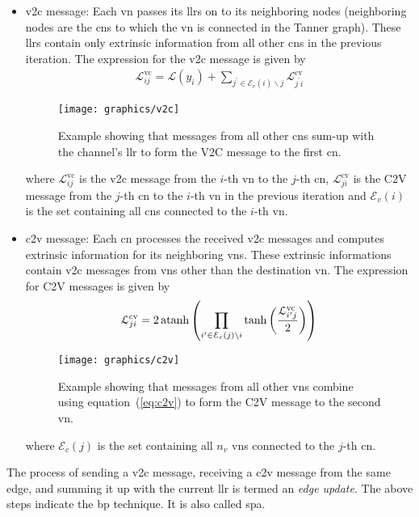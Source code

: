 \begin{itemize}
  \item \gls{v2c} message: Each \gls{vn} passes its \glspl{llr} on to its neighboring nodes (neighboring nodes are the \glspl{cn} to which the \gls{vn} is connected in the Tanner graph). These \glspl{llr} contain only extrinsic information from all other \glspl{cn} in the previous iteration. The expression for the \gls{v2c} message is given by~\cite{Hagenauer1996}
  \begin{align}
    \mathcal{L}^{\mathrm{vc}}_{ij}=\mathcal{L}(y_i)+\sum_{j^\prime\in\mathcal{E}_v(i)\backslash j} \mathcal{L}^{\mathrm{cv}}_{j^\prime i}
  \end{align}
  \begin{figure}[htbp]
    \centering
    \texttt{[image: graphics/v2c]}
    \caption[Representation of V2C message generation.]{Example showing that messages from all other \glspl{cn} sum-up with the channel's \gls{llr} to form the V2C message to the first \gls{cn}.}
    \label{fig:v2c}
  \end{figure}
  where $\mathcal{L}^{\mathrm{vc}}_{ij}$ is the \gls{v2c} message from the $i$-th \gls{vn} to the $j$-th \gls{cn}, $\mathcal{L}^{\mathrm{cv}}_{ji}$ is the C2V message from the $j$-th \gls{cn} to the $i$-th \gls{vn} in the previous iteration and $\mathcal{E}_v(i)$ is the set containing  all \glspl{cn} connected to the $i$-th \gls{vn}.
  \item \gls{c2v} message: Each \gls{cn} processes the received \gls{v2c} messages and computes extrinsic information for its neighboring \glspl{vn}. These extrinsic informations contain \gls{v2c} messages from \glspl{vn} other than the destination \gls{vn}. The expression for C2V messages is given by~\cite{Hagenauer1996}
  \begin{align}\label{eq:c2v}
  \mathcal{L}^{\mathrm{cv}}_{ji}=2\operatorname{atanh}\left(\prod_{i^\prime\in\mathcal{E}_c(j)\backslash i}\tanh\left(\frac{\mathcal{L}^{\mathrm{vc}}_{i^\prime j}}{2}\right)\right)
  \end{align}
  \begin{figure}[htbp]
    \centering
    \texttt{[image: graphics/c2v]}
    \caption[Representation of C2V message generation.]{Example showing that messages from all other \glspl{vn} combine using equation~(\ref{eq:c2v}) to form the C2V message to the second \gls{vn}.}
    \label{fig:c2v}
  \end{figure}
  where $\mathcal{E}_c(j)$ is the set containing all $n_v$ \glspl{vn} connected to the $j$-th \gls{cn}.
\end{itemize}
The process of sending a \gls{v2c} message, receiving a \gls{c2v} message from the same edge, and summing it up with the current \gls{llr} is termed an \emph{edge update}. The above steps indicate the \gls{bp} technique. It is also called \gls{spa}.

